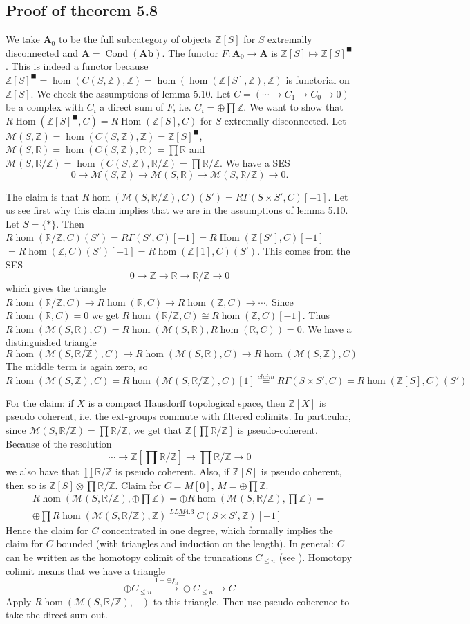\documentclass[12pt]{article}
\theoremstyle{darkgreentheorem}
\theoremstyle{darkbluedefinition}
\theoremstyle{darkredexample}
\theoremstyle{remark}
\newcommand{\Z}{\mathbb{Z}}
\newcommand{\R}{\mathbb{R}}
\newcommand{\1}{\mathbbm{1}}
\newcommand{\A}{\mathbf{A}}
\newcommand{\Ab}{\mathbf{Ab}}
\newcommand{\M}{\mathcal{M}}
\DeclareMathOperator{\Hom}{Hom}
\DeclareMathOperator{\Cond}{Cond}
\newcommand{\ot}{\otimes}
\newcommand{\op}{\oplus}
\newcommand{\tms}{\times}
\newcommand{\solid}{^{\blacksquare}}
\begin{document}
\subsection{Proof of theorem 5.8}

We take $\A_{0}$ to be the full subcategory of objects $\Z[S]$ for $S$ extremally disconnected and $\A=\Cond(\Ab)$.
The functor $F\colon \A_{0}\to \A$ is $\Z[S]\mapsto \Z[S]\solid$.
This is indeed a functor because $\Z[S]\solid=\hom(C(S,\Z),\Z)=\hom(\hom(\Z[S],\Z),\Z)$ is functorial on $\Z[S]$.
We check the assumptions of lemma 5.10.
Let $C=(\cdots \to C_{1}\to C_{0}\to 0)$ be a complex with $C_{i}$ a direct sum of $F$, i.e. $C_{i}=\op \prod \Z$.
We want to show that $R\Hom(\Z[S]\solid,C)=R\Hom(\Z[S],C)$ for $S$ extremally disconnected.
Let $\M(S,\Z)=\hom(C(S,\Z),\Z)=\Z[S]\solid$, $\M(S,\R)=\hom(C(S,\Z),\R)=\prod \R$ and $\M(S,\R/\Z)=\hom(C(S,\Z),\R/\Z)=\prod \R/\Z$.
We have a SES
\[ 0\to \M(S,\Z)\to \M(S,\R)\to \M(S,\R/\Z)\to 0.\]

The claim is that $R\hom(\M(S,\R/\Z),C)(S')=R\Gamma (S\tms S',C)[-1]$.
Let us see first why this claim implies that we are in the assumptions of lemma 5.10.
Let $S=\{*\}$.
Then $R\hom(\R/\Z,C)(S')=R\Gamma(S',C)[-1]=R\Hom(\Z[S'],C)[-1]$$=R\hom(\Z,C)(S')[-1]=R\hom(\Z[1],C)(S')$.
This comes from the SES
\[ 0\to \Z\to \R\to \R/\Z\to 0 \]
which gives the triangle $R\hom(\R/\Z,C)\to R\hom(\R,C)\to R\hom(\Z,C)\to \cdots$.
Since $R\hom(\R,C)=0$ we get $R\hom(\R/\Z,C)\cong R\hom(\Z,C)[-1]$.
Thus $R\hom(\M(S,\R),C)=R\hom(\M(S,\R),R\hom(\R,C))=0$.
We have a distinguished triangle
\[ R\hom(\M(S,\R/\Z),C)\to R\hom(\M(S,\R),C)\to R\hom(\M(S,\Z),C) \]
The middle term is again zero, so
\[ R\hom(\M(S,\Z),C)=R\hom(\M(S,\R/\Z),C)[1]\overset{claim}{=} R\Gamma(S\tms S',C)=R\hom(\Z[S],C)(S')\]

For the claim: if $X$ is a compact Hausdorff topological space, then $\Z[X]$ is pseudo coherent, i.e. the ext-groups commute with filtered colimits.
In particular, since $\M(S,\R/\Z)=\prod \R/\Z$, we get that $\Z[\prod \R/\Z]$ is pseudo-coherent.
Because of the resolution
\[ \cdots \to \Z[\prod \R/\Z]\to \prod \R/\Z\to 0\]
we also have that $\prod \R/\Z$ is pseudo coherent.
Also, if $\Z[S]$ is pseudo coherent, then so is $\Z[S]\ot \prod \R/\Z$.
Claim for $C=M[0]$, $M=\op \prod \Z$.
\begin{multline*}
    R\hom(\M(S,\R/\Z),\op \prod \Z)=\op R\hom(\M(S,\R/\Z),\prod \Z) =\\
    \op \prod R\hom(\M(S,\R/\Z),\Z) \overset{LLM 4.3}{=} C(S\tms S',\Z)[-1]
\end{multline*}
Hence the claim for $C$ concentrated in one degree, which formally implies the claim for $C$ bounded (with triangles and induction on the length).
In general: $C$ can be written as the homotopy colimit of the truncations $C_{\leqslant n}$ (see \cite[Tag 093W]{sta19}).
Homotopy colimit means that we have a triangle
\[ \op C_{\leqslant n} \xrightarrow{1-\op f_{n}}\op C_{\leqslant n}\to C \]
Apply $R\hom(\M(S,\R/\Z),-)$ to this triangle.
Then use pseudo coherence to take the direct sum out.
\end{document}
